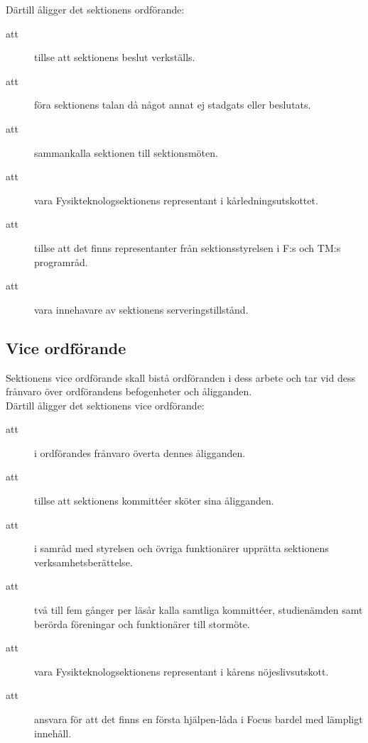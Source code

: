 \documentclass[a4paper]{article}
\begin{document}
\begin{foreningenv}{\forening{}}
    Därtill åligger det sektionens ordförande:
    \begin{description}
        \item[att] tillse att sektionens beslut verkställs. 
        \item[att] föra sektionens talan då något annat ej stadgats eller beslutats.
        \item[att] sammankalla sektionen till sektionsmöten.
        \item[att] vara Fysikteknologsektionens representant i kårledningsutskottet.
        \item[att] tillse att det finns representanter från sektionsstyrelsen i F:s och TM:s programråd.
        \item[att] vara innehavare av sektionens serveringstillstånd.
    \end{description}
    
    \subsection{Vice ordförande}
    Sektionens vice ordförande skall bistå ordföranden i dess arbete och tar vid dess frånvaro över ordförandens befogenheter och åligganden. \\
    
    Därtill åligger det sektionens vice ordförande:
    \begin{description}
        \item[att] i ordförandes frånvaro överta dennes åligganden. 
        \item[att] tillse att sektionens kommittéer sköter sina åligganden. 
        \item[att] i samråd med styrelsen och övriga funktionärer upprätta sektionens verksamhetsberättelse.
        \item[att] två till fem gånger per läsår kalla samtliga kommittéer, studienämden samt berörda föreningar och funktionärer till stormöte. 
        \item[att] vara Fysikteknologsektionens representant i kårens nöjeslivsutskott. 
        \item[att] ansvara för att det finns en första hjälpen-låda i Focus bardel med lämpligt innehåll. 
    \end{description}
    

\end{foreningenv}
\end{document}
